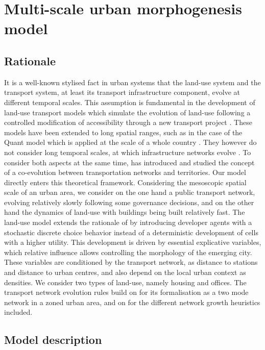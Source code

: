 \documentclass[letterpaper]{article}
\begin{document}
\section{Multi-scale urban morphogenesis model}

\subsection{Rationale}

It is a well-known stylised fact in urban systems that the land-use system and the transport system, at least its transport infrastructure component, evolve at different temporal scales. This assumption is fundamental in the development of land-use transport models which simulate the evolution of land-use following a controlled modification of accessibility through a new transport project \citep{wegener2004overview}. These models have been extended to long spatial ranges, such as in the case of the Quant model which is applied at the scale of a whole country \citep{batty2021new}. They however do not consider long temporal scales, at which infrastructure networks evolve \citep{lagesse2015spatial}. To consider both aspects at the same time, \cite{raimbault2018caracterisation} has introduced and studied the concept of a co-evolution between transportation networks and territories. Our model directly enters this theoretical framework. Considering the mesoscopic spatial scale of an urban area, we consider on the one hand a public transport network, evolving relatively slowly following some governance decisions, and on the other hand the dynamics of land-use with buildings being built relatively fast. The land-use model extends the rationale of \cite{raimbault2014hybrid} by introducing developer agents with a stochastic discrete choice behavior instead of a deterministic development of cells with a higher utility. This development is driven by essential explicative variables, which relative influence allows controlling the morphology of the emerging city. These variables are conditioned by the transport network, as distance to stations and distance to urban centres, and also depend on the local urban context as densities. We consider two types of land-use, namely housing and offices. The transport network evolution rules build on \cite{raimbault2021introducing} for its formalisation as a two mode network in a zoned urban area, and on \cite{raimbault2018multi} for the different network growth heuristics included.


\subsection{Model description}
\end{document}
